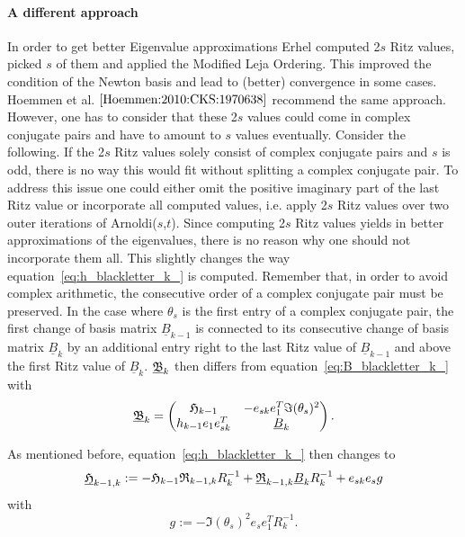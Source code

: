 \documentclass{scrartcl}
\begin{document}
\paragraph{A different approach}
In order to get better Eigenvalue approximations Erhel \cite{Erhel95aparallel} computed 2$s$ Ritz values, picked $s$ of them and applied the Modified Leja Ordering. This improved the condition of the Newton basis and lead to (better) convergence in some cases. Hoemmen et al. $\cite{Hoemmen:2010:CKS:1970638}$ recommend the same approach. However, one has to consider that these 2$s$ values could come in complex conjugate pairs and have to amount to $s$ values eventually. Consider the following. If the 2$s$ Ritz values solely consist of complex conjugate pairs and $s$ is odd, there is no way this would fit without splitting a complex conjugate pair. To address this issue one could either omit the positive imaginary part of the last Ritz value or incorporate all computed values, i.e. apply 2$s$ Ritz values over two outer iterations of Arnoldi($s$,$t$). Since computing 2$s$ Ritz values yields in better approximations of the eigenvalues, there is no reason why one should not incorporate them all. This slightly changes the way equation~\eqref{eq:h_blackletter_k_} is computed. Remember that, in order to avoid complex arithmetic, the consecutive order of a complex conjugate pair must be preserved. In the case where $\theta_s$ is the first entry of a complex conjugate pair, the first change of basis matrix $\underline{B}_{k - 1 }$ is connected to its consecutive change of basis matrix $\underline{B}_{k}$ by an additional entry right to the last Ritz value of $\underline{B}_{k - 1}$ and above the first Ritz value of $\underline{B}_k$. $\underline{\frak{B}}_k$ then differs from equation~\eqref{eq:B_blackletter_k_} with
\begin{equation}
\underline{\frak{B}}_{k} = 
\begin{pmatrix}
	\frak{H}_{k - 1} & -e_{sk} e^T_1 \Im (\theta_s)^2 \\
	h_{k - 1} e_1 e^T_{sk} & \underline{B}_k
\end{pmatrix}.
\end{equation}

As mentioned before, equation~\eqref{eq:h_blackletter_k_} then changes to
\begin{equation}
\underline{\frak{H}}_{k - 1, k} := -\frak{H}_{k - 1} \frak{R}_{k - 1, k} R^{-1}_k + \underline{\frak{R}}_{k - 1, k} \underline{B}_k R^{-1}_k + e_{sk} e_s g
\end{equation}
with
\begin{equation*}
g := - \Im (\theta_s)^2 e_{s} e^T_1  R^{-1}_{k}.
\end{equation*}
\end{document}
